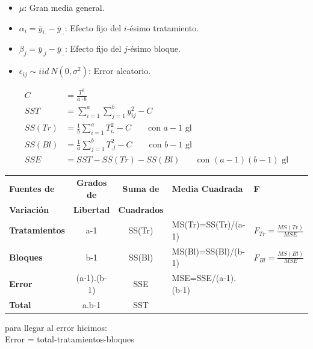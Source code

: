 \documentclass[12pt,a4paper]{article}
\begin{document}
\begin{itemize}[leftmargin=40pt,itemsep=6pt,topsep=3pt,parsep=0pt]
  \item $\mu$: Gran media general.
  \item $\alpha_i=\bar{y}_{i.}-\bar{y}_{..}$: Efecto fijo del $i$-ésimo tratamiento.
  \item $\beta_j=\bar{y}_{.j}-\bar{y}_{..}$: Efecto fijo del $j$-ésimo bloque.
  \item $\epsilon_{ij} \sim iid\ N(0,\sigma^2)$: Error aleatorio.
\end{itemize}

\begin{align*}
C &= \frac{T_{..}^2}{a\cdot b} \\
SST &= \sum_{i=1}^{a}\sum_{j=1}^{b} y_{ij}^2 - C \\
SS(Tr) &= \frac{1}{b}\sum_{i=1}^{a} T_{i.}^2 - C \qquad \text{con } a-1 \text{ gl} \\
SS(Bl) &= \frac{1}{a}\sum_{j=1}^{b} T_{.j}^2 - C \qquad \text{con } b-1 \text{ gl} \\
SSE &= SST - SS(Tr) - SS(Bl) \qquad \text{con } (a-1)(b-1) \text{ gl}
\end{align*}

\begin{center}
{\fontsize{12}{14.5}\selectfont
\setlength{\tabcolsep}{5pt}
\begin{tabular}{|l|c|c|l|l|}
\hline
\textbf{Fuentes de} & \textbf{Grados de} & \textbf{Suma de} & \textbf{Media Cuadrada} & \textbf{F} \\
\textbf{Variación} & \textbf{Libertad} & \textbf{Cuadrados} & & \\
\hline
\textbf{Tratamientos} & a-1 & SS(Tr) & MS(Tr)=SS(Tr)/(a-1) & $F_{Tr} = \frac{MS(Tr)}{MSE}$ \\
\hline
\textbf{Bloques} & b-1 & SS(Bl) & MS(Bl)=SS(Bl)/(b-1) & $F_{Bl} = \frac{MS(Bl)}{MSE}$ \\
\hline
\textbf{Error} & (a-1).(b-1) & SSE & MSE=SSE/(a-1).(b-1) & \\
\hline
\textbf{Total} & a.b-1 & SST & & \\
\hline
\end{tabular}
}
\end{center}

\hspace{40pt}\begin{minipage}{0.8\linewidth}
para llegar al error hicimos:\\
Error = total-tratamientos-bloques
\end{minipage}
\end{document}
